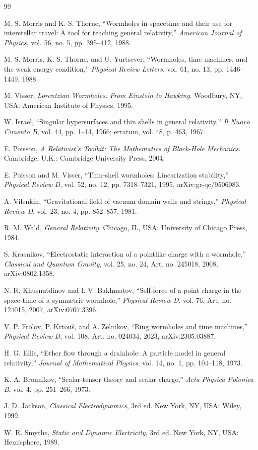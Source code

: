 \documentclass[journal,a4paper]{IEEEtran}
\begin{document}
\begin{thebibliography}{99}

M. S. Morris and K. S. Thorne,
``Wormholes in spacetime and their use for interstellar travel: A tool for teaching general relativity,''
\emph{American Journal of Physics}, vol. 56, no. 5, pp. 395--412, 1988.

M. S. Morris, K. S. Thorne, and U. Yurtsever,
``Wormholes, time machines, and the weak energy condition,''
\emph{Physical Review Letters}, vol. 61, no. 13, pp. 1446--1449, 1988.

M. Visser,
\emph{Lorentzian Wormholes: From Einstein to Hawking}.
Woodbury, NY, USA: American Institute of Physics, 1995.

W. Israel,
``Singular hypersurfaces and thin shells in general relativity,''
\emph{Il Nuovo Cimento B}, vol. 44, pp. 1--14, 1966;
erratum, vol. 48, p. 463, 1967.

E. Poisson,
\emph{A Relativist's Toolkit: The Mathematics of Black-Hole Mechanics}.
Cambridge, U.K.: Cambridge University Press, 2004.


E. Poisson and M. Visser,
``Thin-shell wormholes: Linearization stability,''
\emph{Physical Review D}, vol. 52, no. 12, pp. 7318--7321, 1995,
arXiv:gr-qc/9506083.

A. Vilenkin,
``Gravitational field of vacuum domain walls and strings,''
\emph{Physical Review D}, vol. 23, no. 4, pp. 852--857, 1981.

R. M. Wald,
\emph{General Relativity}.
Chicago, IL, USA: University of Chicago Press, 1984.

S. Krasnikov,
``Electrostatic interaction of a pointlike charge with a wormhole,''
\emph{Classical and Quantum Gravity}, vol. 25, no. 24, Art. no. 245018, 2008,
arXiv:0802.1358.

N. R. Khusnutdinov and I. V. Bakhmatov,
``Self-force of a point charge in the space-time of a symmetric wormhole,''
\emph{Physical Review D}, vol. 76, Art. no. 124015, 2007,
arXiv:0707.3396.

V. P. Frolov, P. Krtou\v{s}, and A. Zelnikov,
``Ring wormholes and time machines,''
\emph{Physical Review D}, vol. 108, Art. no. 024034, 2023,
arXiv:2305.03887.

H. G. Ellis,
``Ether flow through a drainhole: A particle model in general relativity,''
\emph{Journal of Mathematical Physics}, vol. 14, no. 1, pp. 104--118, 1973.

K. A. Bronnikov,
``Scalar-tensor theory and scalar charge,''
\emph{Acta Physica Polonica B}, vol. 4, pp. 251--266, 1973.

J. D. Jackson,
\emph{Classical Electrodynamics}, 3rd ed.
New York, NY, USA: Wiley, 1999.

W. R. Smythe,
\emph{Static and Dynamic Electricity}, 3rd ed.
New York, NY, USA: Hemisphere, 1989.

\end{thebibliography}
\end{document}
